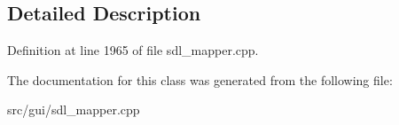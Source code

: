 \subsection{Detailed Description}


Definition at line 1965 of file sdl\-\_\-mapper.\-cpp.



The documentation for this class was generated from the following file\-:\begin{DoxyCompactItemize}
\item 
src/gui/sdl\-\_\-mapper.\-cpp\end{DoxyCompactItemize}
